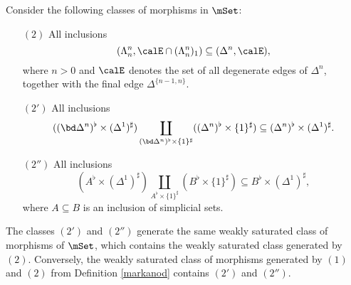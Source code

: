 \begin{proposition}\label{goldegg}
Consider the following classes of morphisms in $\mSet$:

\begin{itemize}
\item[$(2)$] All inclusions
$$ ( \Lambda^n_n, \calE \cap (\Lambda^n_n)_{1} ) \subseteq ( \Delta^n, \calE ),$$
where $n > 0$ and $\calE$ denotes the set of all degenerate edges of $\Delta^n$, together with the final edge $\Delta^{ \{n-1,n\} }$.

\item[$(2')$] All inclusions
$$ ( (\bd \Delta^n)^{\flat} \times (\Delta^1)^{\sharp})  \coprod_{ (\bd \Delta^n)^{\flat} \times
\{1\}^{\sharp} } ((\Delta^n)^{\flat} \times \{1\}^{\sharp}) \subseteq (\Delta^n)^{\flat} \times (\Delta^1)^{\sharp}.$$ 

\item[$(2'')$] All inclusions
$$ ( A^{\flat} \times (\Delta^1)^{\sharp})  \coprod_{ A^{\flat} \times
\{1\}^{\sharp} } (B^{\flat} \times \{1\}^{\sharp}) \subseteq B^{\flat} \times (\Delta^1)^{\sharp},$$
where $A \subseteq B$ is an inclusion of simplicial sets. 
\end{itemize}

The classes $(2')$ and $(2'')$ generate the same weakly saturated class of morphisms of $\mSet$, which contains the weakly saturated class generated by $(2)$. Conversely, the weakly saturated class of morphisms generated by $(1)$ and $(2)$ from Definition \ref{markanod} contains $(2')$ and $(2'')$.
\end{proposition}

